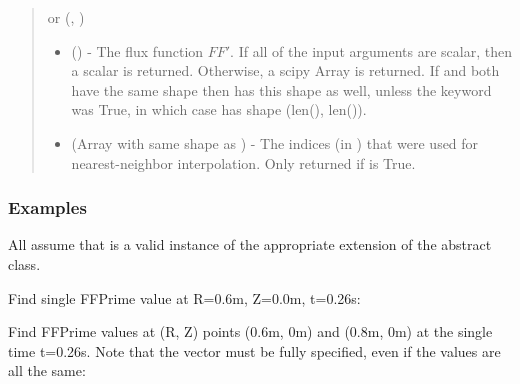 \documentclass[letterpaper,10pt,english]{sphinxmanual}
\begin{document}
\begin{fulllineitems}
\begin{fulllineitems}
\begin{quote}
\begin{description}
 or (, )
\begin{itemize}
\item {} 
 () - The flux function \(FF'\).
If all of the input arguments are scalar, then a scalar is
returned. Otherwise, a scipy Array is returned. If  and 
both have the same shape then  has this shape as well,
unless the  keyword was True, in which case 
has shape (len(), len()).

\item {} 
 (Array with same shape as ) - The indices
(in ) that were used for
nearest-neighbor interpolation. Only returned if  is
True.

\end{itemize}


\end{description}\end{quote}
\subsubsection*{Examples}

All assume that  is a valid instance of the
appropriate extension of the {\hyperref[\detokenize{eqtools:eqtools.core.Equilibrium}]{}} abstract class.

Find single FFPrime value at R=0.6m, Z=0.0m, t=0.26s:

\begin{sphinxVerbatim}[commandchars=\\\{\}]
    
\end{sphinxVerbatim}

Find FFPrime values at (R, Z) points (0.6m, 0m) and (0.8m, 0m) at the
single time t=0.26s. Note that the  vector must be fully specified,
even if the values are all the same:

\begin{sphinxVerbatim}[commandchars=\\\{\}]
  \PYG{p}{[} \PYG{p}{]} \PYG{p}{[} \PYG{p}{]} 
\end{sphinxVerbatim}


\end{fulllineitems}
\end{fulllineitems}
\end{document}
